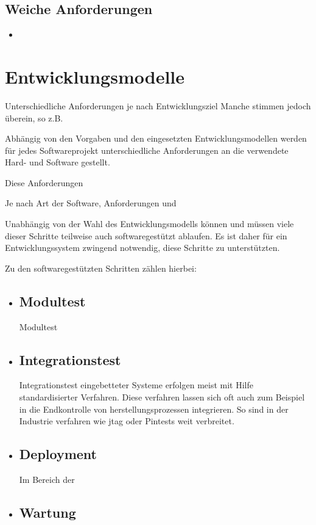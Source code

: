 \subsection{Weiche Anforderungen}
\begin{itemize}
  \item 
\end{itemize}


\section{Entwicklungsmodelle}
Unterschiedliche Anforderungen je nach Entwicklungsziel
Manche stimmen jedoch überein, so z.B.
  



Abhängig von den Vorgaben und den eingesetzten Entwicklungsmodellen werden
für jedes Softwareprojekt unterschiedliche Anforderungen an die verwendete Hard-
und Software gestellt.

Diese Anforderungen 

 Je nach Art der Software, Anforderungen und

Unabhängig von der Wahl des Entwicklungsmodells können und
müssen viele dieser Schritte teilweise auch softwaregestützt ablaufen. Es ist
daher für ein Entwicklungssystem zwingend notwendig, diese Schritte zu
unterstützten.

Zu den softwaregestützten Schritten zählen hierbei:
\begin{itemize}
  \item \subsection*{Modultest} Modultest
  \item \subsection*{Integrationstest} Integrationstest eingebetteter Systeme
  erfolgen meist mit Hilfe standardisierter Verfahren. Diese verfahren lassen
  sich oft auch zum Beispiel in die Endkontrolle von herstellungsprozessen
  integrieren. So sind in der Industrie verfahren wie \gls{jtag} oder
  Pintests weit verbreitet.
  \item \subsection*{Deployment} Im Bereich der 
  \item \subsection*{Wartung}
\end{itemize}

